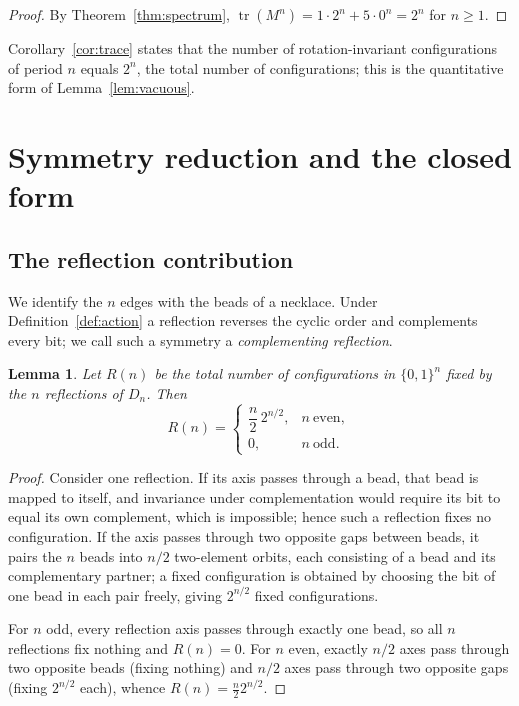 \documentclass[11pt,a4paper]{article}
\theoremstyle{plain}
\newtheorem{lemma}[theorem]{Lemma}
\theoremstyle{definition}
\theoremstyle{remark}
\DeclareMathOperator{\tr}{tr}
\newcommand{\Dih}{D_{n}}
\numberwithin{equation}{section}
\begin{document}
\begin{proof}
By Theorem~\ref{thm:spectrum}, $\tr(M^{n})=1\cdot 2^{n}+5\cdot 0^{n}=2^{n}$
for $n\ge 1$.
\end{proof}

Corollary~\ref{cor:trace} states that the number of rotation-invariant
configurations of period $n$ equals $2^{n}$, the total number of
configurations; this is the quantitative form of Lemma~\ref{lem:vacuous}.

\section{Symmetry reduction and the closed form}\label{sec:burnside}

\subsection{The reflection contribution}

We identify the $n$ edges with the beads of a necklace. Under
Definition~\ref{def:action} a reflection reverses the cyclic order and
complements every bit; we call such a symmetry a \emph{complementing
reflection}.

\begin{lemma}\label{lem:refl}
Let $R(n)$ be the total number of configurations in $\{0,1\}^{n}$ fixed by
the $n$ reflections of $\Dih$. Then
\[
R(n)=\begin{cases}\dfrac{n}{2}\,2^{n/2}, & n\ \text{even},\\[4pt] 0, & n\ \text{odd}.\end{cases}
\]
\end{lemma}

\begin{proof}
Consider one reflection. If its axis passes through a bead, that bead is
mapped to itself, and invariance under complementation would require its
bit to equal its own complement, which is impossible; hence such a
reflection fixes no configuration. If the axis passes through two opposite
gaps between beads, it pairs the $n$ beads into $n/2$ two-element orbits,
each consisting of a bead and its complementary partner; a fixed
configuration is obtained by choosing the bit of one bead in each pair
freely, giving $2^{n/2}$ fixed configurations.

For $n$ odd, every reflection axis passes through exactly one bead, so all
$n$ reflections fix nothing and $R(n)=0$. For $n$ even, exactly $n/2$
axes pass through two opposite beads (fixing nothing) and $n/2$ axes pass
through two opposite gaps (fixing $2^{n/2}$ each), whence
$R(n)=\frac{n}{2}2^{n/2}$.
\end{proof}
\end{document}

